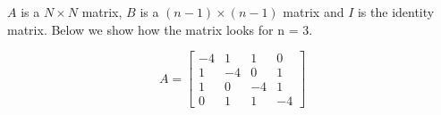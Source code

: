$A$ is a $N \times N$ matrix, $B$ is a $(n-1) \times (n-1)$ matrix and $I$ is the identity matrix. Below we show how the matrix looks for n = 3.

$$
A = \begin{bmatrix}
 -4 &  1 &  1 &  0 \\
  1 & -4 &  0 &  1 \\
  1 &  0 & -4 &  1 \\
  0 &  1 &  1 & -4
\end{bmatrix}
$$



